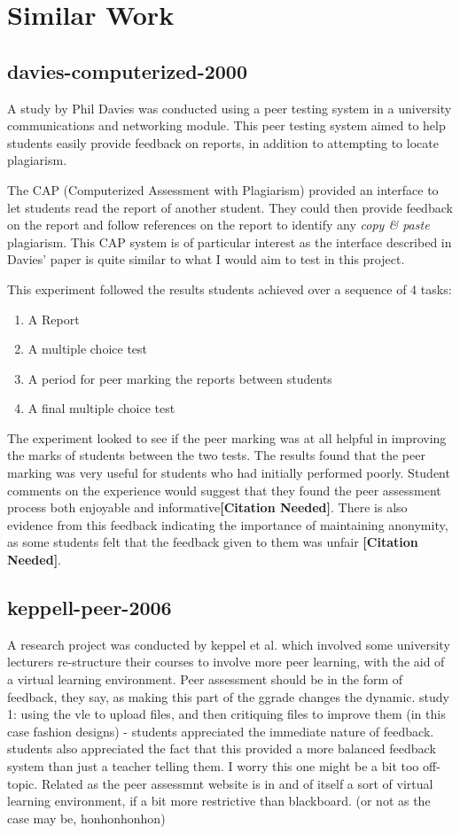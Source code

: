 \documentclass[a4paper,11pt]{report}
\newcommand{\cn}{\textbf{[Citation Needed]}}
\begin{document}
\section{Similar Work}

\subsection{davies-computerized-2000}
A study by Phil Davies\cite{davies_computerized_2000} was conducted using a peer testing system in a university communications and networking module. This peer testing system aimed to help students easily provide feedback on reports, in addition to attempting to locate plagiarism.\par
The CAP (Computerized Assessment with Plagiarism) provided an interface to let students read the report of another student. They could then provide feedback on the report and follow references on the report to identify any \textit{copy \& paste} plagiarism. This CAP system is of particular interest as the interface described in Davies' paper is quite similar to what I would aim to test in this project.\par
This experiment followed the results students achieved over a sequence of 4 tasks:
\begin{enumerate}
\item A Report
\item A multiple choice test
\item A period for peer marking the reports between students
\item A final multiple choice test
\end{enumerate}
The experiment looked to see if the peer marking was at all helpful in improving the marks of students between the two tests. The results found that the peer marking was very useful for students who had initially performed poorly. Student comments on the experience would suggest that they found the peer assessment process both enjoyable and informative\cn. There is also evidence from this feedback indicating the importance of maintaining anonymity, as some students felt that the feedback given to them was unfair \cn.


\subsection{keppell-peer-2006}
A research project was conducted by keppel et al.\cite{keppell_peer_2006} which involved some university lecturers re-structure their courses to involve more peer learning, with the aid of a virtual learning environment. 
Peer assessment should be in the form of feedback, they say, as making this part of the ggrade changes the dynamic.
study 1: using the vle to upload files, and then critiquing files to improve them (in this case fashion designs) - students appreciated the immediate nature of feedback. students also appreciated the fact that this provided a more balanced feedback system than just a teacher telling them. 
I worry this one might be a bit too off-topic.
Related as the peer assessmnt website is in and of itself a sort of virtual learning environment, if a bit more restrictive than blackboard. (or not as the case may be, honhonhonhon)
\end{document}
